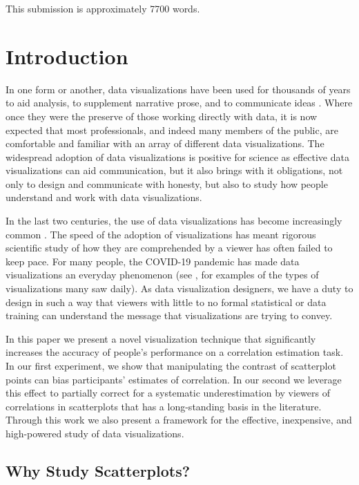 \documentclass[preprint, 3p,
authoryear]{elsarticle} %
\begin{document}
This submission is approximately 7700 words.

\hypertarget{introduction}{%
\section{Introduction}\label{introduction}}

In one form or another, data visualizations have been used for thousands
of years to aid analysis, to supplement narrative prose, and to
communicate ideas \citep{azzam_2013}. Where once they were the preserve
of those working directly with data, it is now expected that most
professionals, and indeed many members of the public, are comfortable
and familiar with an array of different data visualizations. The
widespread adoption of data visualizations is positive for science as
effective data visualizations can aid communication, but it also brings
with it obligations, not only to design and communicate with honesty,
but also to study how people understand and work with data
visualizations.

In the last two centuries, the use of data visualizations has become
increasingly common \citep{friendly_2005, azzam_2013}. The speed of the
adoption of visualizations has meant rigorous scientific study of how
they are comprehended by a viewer has often failed to keep pace. For
many people, the COVID-19 pandemic has made data visualizations an
everyday phenomenon (see \citealp{bbc_2022}, for examples of the types
of visualizations many saw daily). As data visualization designers, we
have a duty to design in such a way that viewers with little to no
formal statistical or data training can understand the message that
visualizations are trying to convey.

In this paper we present a novel visualization technique that
significantly increases the accuracy of people's performance on a
correlation estimation task. In our first experiment, we show that
manipulating the contrast of scatterplot points can bias participants'
estimates of correlation. In our second we leverage this effect to
partially correct for a systematic underestimation by viewers of
correlations in scatterplots that has a long-standing basis in the
literature. Through this work we also present a framework for the
effective, inexpensive, and high-powered study of data visualizations.

\hypertarget{why-study-scatterplots}{%
\subsection{Why Study Scatterplots?}\label{why-study-scatterplots}}
\end{document}
